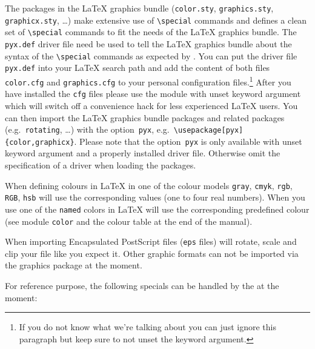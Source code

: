 The packages in the \LaTeX{} graphics bundle (\texttt{color.sty},
\texttt{graphics.sty}, \texttt{graphicx.sty}, \ldots) make extensive
use of \texttt{\textbackslash{}special} commands and \PyX{} defines a
clean set of \texttt{\textbackslash{}special} commands to fit the
needs of the \LaTeX{} graphics bundle. The \texttt{pyx.def} driver
file need be used to tell the \LaTeX{} graphics bundle about the
syntax of the \texttt{\textbackslash{}special} commands as expected by
\PyX{}. You can put the driver file \texttt{pyx.def} into your
\LaTeX{} search path and add the content of both files
\texttt{color.cfg} and \texttt{graphics.cfg} to your personal
configuration files.\footnote{If you do not know what we're talking
about you can just ignore this paragraph but keep sure to not unset
the  keyword argument.} After you have installed the
\texttt{cfg} files please use the  module with unset
 keyword argument which will switch off a
convenience hack for less experienced \LaTeX{} users. You can then
import the \LaTeX{} graphics bundle packages and related packages
(e.g.~\texttt{rotating}, \ldots) with the option~\texttt{pyx},
e.g.~\texttt{\textbackslash{}usepackage[pyx]\{color,graphicx\}}. Please
note that the option~\texttt{pyx} is only available with unset
 keyword argument and a properly installed driver
file. Otherwise omit the specification of a driver when loading the
packages.

When defining colours in \LaTeX{} in one of the colour models
\texttt{gray}, \texttt{cmyk}, \texttt{rgb}, \texttt{RGB}, \texttt{hsb}
\PyX{} will use the corresponding values (one to four real numbers).
When you use one of the \texttt{named} colors in \LaTeX{} \PyX{} will
use the corresponding predefined colour (see module \texttt{color} and
the colour table at the end of the manual).

When importing Encapsulated PostScript files (\texttt{eps} files)
\PyX{} will rotate, scale and clip your file like you expect it. Other
graphic formats can not be imported via the graphics package at the
moment.

For reference purpose, the following specials can be handled by the
\PyX{} at the moment:

